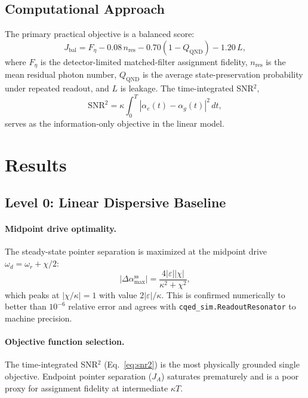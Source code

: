 \documentclass[aps,pra,twocolumn,reprint,amsmath,amssymb]{revtex4-2}
\begin{document}
\subsection{Computational Approach}

The primary practical objective is a balanced score:
\begin{equation}
J_\mathrm{bal} = F_\eta - 0.08\,n_\mathrm{res} - 0.70(1 - Q_\mathrm{QND}) - 1.20\,L,
\label{eq:balanced_score}
\end{equation}
where $F_\eta$ is the detector-limited matched-filter assignment fidelity, $n_\mathrm{res}$ is the mean residual photon number, $Q_\mathrm{QND}$ is the average state-preservation probability under repeated readout, and $L$ is leakage. The time-integrated SNR$^2$,
\begin{equation}
\mathrm{SNR}^2 = \kappa\int_0^T|\alpha_e(t) - \alpha_g(t)|^2\,dt,
\label{eq:snr2}
\end{equation}
serves as the information-only objective in the linear model.

\section{Results}

\subsection{Level 0: Linear Dispersive Baseline}
\label{sec:linear}

\paragraph{Midpoint drive optimality.}
The steady-state pointer separation is maximized at the midpoint drive $\omega_d = \omega_r + \chi/2$:
\begin{equation}
|\Delta\alpha^\mathrm{ss}_\mathrm{max}| = \frac{4|\varepsilon||\chi|}{\kappa^2 + \chi^2},
\end{equation}
which peaks at $|\chi/\kappa|=1$ with value $2|\varepsilon|/\kappa$. This is confirmed numerically to better than $10^{-6}$ relative error and agrees with \texttt{cqed\_sim.ReadoutResonator} to machine precision.

\paragraph{Objective function selection.}
The time-integrated SNR$^2$ (Eq.~\ref{eq:snr2}) is the most physically grounded single objective. Endpoint pointer separation ($J_A$) saturates prematurely and is a poor proxy for assignment fidelity at intermediate $\kappa T$.
\end{document}
